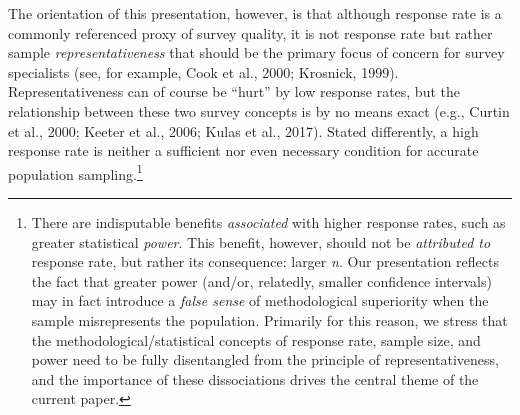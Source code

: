 \documentclass[
  man,mask]{apa7}
\begin{document}
The orientation of this presentation, however, is that although response rate is a commonly referenced proxy of survey quality, it is not response rate but rather sample \emph{representativeness} that should be the primary focus of concern for survey specialists (see, for example, Cook et al., 2000; Krosnick, 1999). Representativeness can of course be ``hurt'' by low response rates, but the relationship between these two survey concepts is by no means exact (e.g., Curtin et al., 2000; Keeter et al., 2006; Kulas et al., 2017). Stated differently, a high response rate is neither a sufficient nor even necessary condition for accurate population sampling.\footnote{There are indisputable benefits \emph{associated} with higher response rates, such as greater statistical \emph{power}. This benefit, however, should not be \emph{attributed to} response rate, but rather its consequence: larger \emph{n}. Our presentation reflects the fact that greater power (and/or, relatedly, smaller confidence intervals) may in fact introduce a \emph{false sense} of methodological superiority when the sample misrepresents the population. Primarily for this reason, we stress that the methodological/statistical concepts of response rate, sample size, and power need to be fully disentangled from the principle of representativeness, and the importance of these dissociations drives the central theme of the current paper.}
\end{document}
